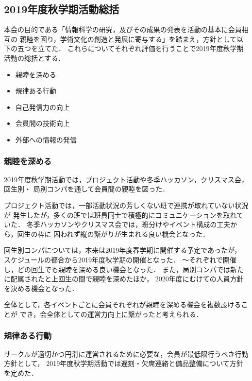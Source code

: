 \subsection*{2019年度秋学期活動総括}


本会の目的である「情報科学の研究，及びその成果の発表を活動の基本に会員相互の
親睦を図り，学術文化の創造と発展に寄与する」を踏まえ，方針として以下の五つを立てた．
これらについてそれぞれ評価を行うことで2019年度秋学期活動の総括とする．

\begin{itemize}
    \item 親睦を深める
    \item 規律ある行動
    \item 自己発信力の向上
    \item 会員間の技術向上
    \item 外部への情報の発信
\end{itemize}

\subsubsection*{親睦を深める}
2019年度秋学期活動では，プロジェクト活動や冬季ハッカソン，クリスマス会，回生別・
局別コンパを通して会員間の親睦を図った．

プロジェクト活動では，一部活動状況の芳しくない班で連携が取れていない状況が
発生したが，多くの班では班員同士で積極的にコミュニケーションを取れていた．
冬季ハッカソンやクリスマス会では，班分けやイベント構成の工夫から，回生の枠に
囚われず縦の繋がりが生まれる良い機会となった．

回生別コンパについては，本来は2019年度春学期に開催する予定であったが，
スケジュールの都合から2019年度秋学期の開催となった．
\firstGrade{}〜\thirdGrade{}それぞれで開催し，どの回生でも親睦を深める良い機会となった．
また，局別コンパでは新たに配属された\firstGrade{}と上回生の間で親睦を深めたほか，
2020年度にむけての人員方針を決める機会となった．

全体として，各イベントごとに会員それぞれが親睦を深める機会を複数設けることが
でき，会全体としての運営力向上に繋がったと考えられる．

\subsubsection*{規律ある行動}
サークルが適切かつ円滑に運営されるために必要な，会員が最低限行うべき行動方針として，
2019年度秋学期活動では遅刻・欠席連絡と備品整備について方針を定めた．

